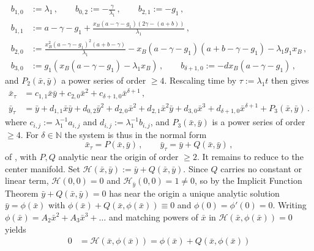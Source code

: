 \documentclass[reqno,11pt]{amsart}
\numberwithin{equation}{section}
\newcommand{\N}{\mathbb{N}}
\begin{document}
\begin{appendix}
\begin{equation*}
\begin{split}
b_{1,0}&:= \lambda_1\,, \qquad b_{0,2}:=-\frac{\gamma}{\lambda_1}\,,\qquad b_{2,1}:= -g_1\,,\\
b_{1,1}&:= a-\gamma-g_1+\frac{x_B(a-\gamma-g_1)(2\gamma-(a+b))}{\lambda_1}\,,\\
b_{2,0}&:= \frac{x_B^2(a-\gamma-g_1)^2(a+b-\gamma)}{\lambda_1}-x_B(a-\gamma-g_1)(a+b-\gamma-g_1)-\lambda_1g_1x_B\,,\\
b_{3,0}&:= g_1\left(x_B(a-\gamma-g_1)-\lambda_1x_B \right)\,, \qquad b_{\delta+1,0}:= -dx_B(a-\gamma-g_1)\,,
\end{split}
\end{equation*}
and $P_2(\bar{x},\bar{y})$ a power series of order $\geq4$. Rescaling time by $\tau:=\lambda_1 t$ then gives 
\begin{subequations}\label{eq:B Trafo 2}
\begin{align}
\bar{x}_\tau &= c_{1,1} \bar{x}\bar{y}+
c_{2,0}\bar{x}^2+c_{\delta+1,0}\bar{x}^{\delta+1}\,,\label{eq:B Trafo 2a}
\\
\bar{y}_\tau &= \bar{y}+d_{1,1}\bar{x}\bar{y}+d_{0,2}\bar{y}^2+
d_{2,0}\bar{x}^2+d_{2,1}\bar{x}^2\bar{y}+d_{3,0}\bar{x}^3+d_{\delta+1,0}\bar{x}^{\delta+1}+P_3(\bar{x},\bar{y})\,.
\end{align}
\end{subequations}
where $c_{i,j}:=\lambda_1^{-1}a_{i,j}$ and $d_{i,j}:=\lambda_1^{-1}b_{i,j}$, and $P_3(\bar{x},\bar{y})$ is a power series of order $\geq4$. For $\delta\in\N$ the system is thus in the normal form
\begin{equation}\label{eq:transformed_vf_B}
\bar{x}_\tau=P(\bar{x},\bar{y})\,, \qquad  \bar{y}_\tau=\bar{y}+Q(\bar{x},\bar{y})\,,
\end{equation}
of \cite[Thm.~1, Sec.~2.11]{Pe01}, with $P,Q$ analytic near the origin of order $\geq2$. It remains to reduce to the center manifold. Set $\mathcal{H}(\bar{x},\bar{y}):=\bar{y}+Q(\bar{x},\bar{y})$. Since $Q$ carries no constant or linear term, $\mathcal{H}(0,0)=0$ and $\mathcal{H}_{\bar{y}}(0,0)=1\neq0$, so by the Implicit Function Theorem $\bar{y}+Q(\bar{x},\bar{y})=0$ has near the origin a unique analytic solution $\bar{y}=\phi(\bar{x})$ with $\phi(\bar{x})+Q(\bar{x},\phi(\bar{x}))\equiv0$ and $\phi(0)=\phi'(0)=0$. Writing $\phi(\bar{x})=A_2\bar{x}^2+A_3\bar{x}^3+\dotsc$ and matching powers of $\bar{x}$ in $\mathcal{H}(\bar{x},\phi(\bar{x}))=0$ yields
\begin{equation*}
\begin{split}
0&=\mathcal{H}(\bar{x},\phi(\bar{x}))=\phi(\bar{x})+Q(\bar{x},\phi(\bar{x})) \\

\end{split}
\end{equation*}
\end{appendix}
\end{document}
